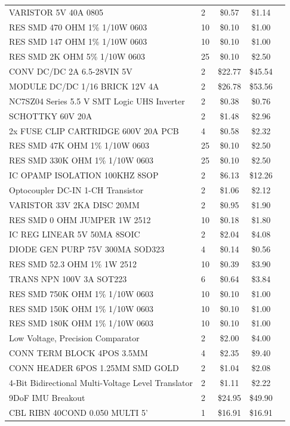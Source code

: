 \documentclass[12pt]{extarticle}
\begin{document}
\begin{appendices}
\begin{table}[H]
\begin{tabular}{ llccl }
VARISTOR 5V 40A 0805	&	2	&	\$0.57	&	\$1.14	\\
RES SMD 470 OHM 1\% 1/10W 0603	&	10	&	\$0.10	&	\$1.00	\\
RES SMD 147 OHM 1\% 1/10W 0603	&	10	&	\$0.10	&	\$1.00	\\
RES SMD 2K OHM 5\% 1/10W 0603	&	25	&	\$0.10	&	\$2.50	\\
CONV DC/DC 2A 6.5-28VIN 5V	&	2	&	\$22.77	&	\$45.54	\\
MODULE DC/DC 1/16 BRICK 12V 4A	&	2	&	\$26.78	&	\$53.56	\\
NC7SZ04 Series 5.5 V SMT Logic UHS Inverter	&	2	&	\$0.38	&	\$0.76	\\
SCHOTTKY 60V 20A	&	2	&	\$1.48	&	\$2.96	\\
2x FUSE CLIP CARTRIDGE 600V 20A PCB	&	4	&	\$0.58	&	\$2.32	\\
RES SMD 47K OHM 1\% 1/10W 0603	&	25	&	\$0.10	&	\$2.50	\\
RES SMD 330K OHM 1\% 1/10W 0603	&	25	&	\$0.10	&	\$2.50	\\
IC OPAMP ISOLATION 100KHZ 8SOP	&	2	&	\$6.13	&	\$12.26	\\
Optocoupler DC-IN 1-CH Transistor 	&	2	&	\$1.06	&	\$2.12	\\
VARISTOR 33V 2KA DISC 20MM	&	2	&	\$0.95	&	\$1.90	\\
RES SMD 0 OHM JUMPER 1W 2512	&	10	&	\$0.18	&	\$1.80	\\
IC REG LINEAR 5V 50MA 8SOIC	&	2	&	\$2.04	&	\$4.08	\\
DIODE GEN PURP 75V 300MA SOD323	&	4	&	\$0.14	&	\$0.56	\\
RES SMD 52.3 OHM 1\% 1W 2512	&	10	&	\$0.39	&	\$3.90	\\
TRANS NPN 100V 3A SOT223	&	6	&	\$0.64	&	\$3.84	\\
RES SMD 750K OHM 1\% 1/10W 0603	&	10	&	\$0.10	&	\$1.00	\\
RES SMD 150K OHM 1\% 1/10W 0603	&	10	&	\$0.10	&	\$1.00	\\
RES SMD 180K OHM 1\% 1/10W 0603	&	10	&	\$0.10	&	\$1.00	\\
Low Voltage, Precision Comparator	&	2	&	\$2.00	&	\$4.00	\\
CONN TERM BLOCK 4POS 3.5MM	&	4	&	\$2.35	&	\$9.40	\\
CONN HEADER 6POS 1.25MM SMD GOLD	&	2	&	\$1.04	&	\$2.08	\\
4-Bit Bidirectional Multi-Voltage Level Translator	&	2	&	\$1.11	&	\$2.22	\\
9DoF IMU Breakout	&	2	&	\$24.95	&	\$49.90	\\
CBL RIBN 40COND 0.050 MULTI 5'	&	1	&	\$16.91	&	\$16.91	\\

\end{tabular}
\end{table}
\end{appendices}
\end{document}
